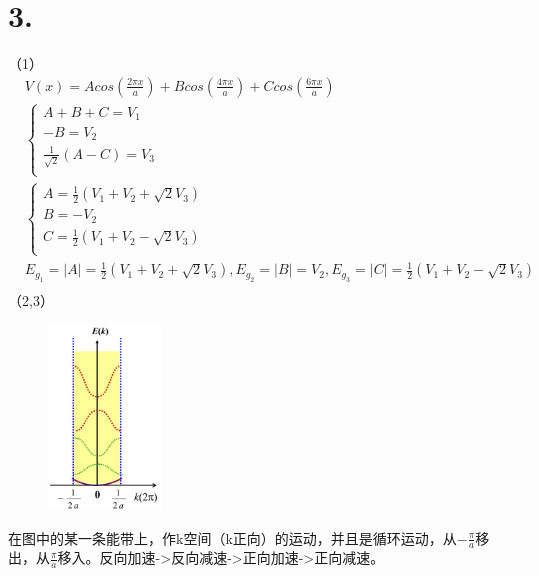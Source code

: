 \documentclass[UTF8]{ctexart}
\begin{document}
\section*{3.}
（1）
\begin{equation*}
    \begin{aligned}
        & V(x)=Acos(\frac{2\pi x}{a})+Bcos(\frac{4\pi x}{a})+Ccos(\frac{6\pi x}{a})\\
        & \begin{cases}
            A+B+C=V_1\\
            -B=V_2\\
            \frac{1}{\sqrt2}(A-C)=V_3\\
        \end{cases}\\
        & \begin{cases}
            A=\frac{1}{2}(V_1+V_2+\sqrt2 V_3)\\
            B=-V_2\\
            C=\frac{1}{2}(V_1+V_2-\sqrt2 V_3)\\
        \end{cases}\\
        & E_{g_1}=\lvert A\rvert = \frac{1}{2}(V_1+V_2+\sqrt2 V_3), E_{g_2}=\lvert B\rvert = V_2, E_{g_3}=\lvert C\rvert = 
        \frac{1}{2}(V_1+V_2-\sqrt2 V_3)\\
    \end{aligned}
\end{equation*}
（2,3）
\begin{figure}
    \includegraphics[width=3cm]{ans-3-2.jpg}
    \caption*{}
\end{figure}
在图中的某一条能带上，作k空间（k正向）的运动，并且是循环运动，从$-\frac{\pi}{a}$移出，从$\frac{\pi}{a}$移入。反向加速->反向减速->正向加速->正向减速。\\
\newline\newline\newline\newline\newline\newline\newline\newline\newline
\end{document}
